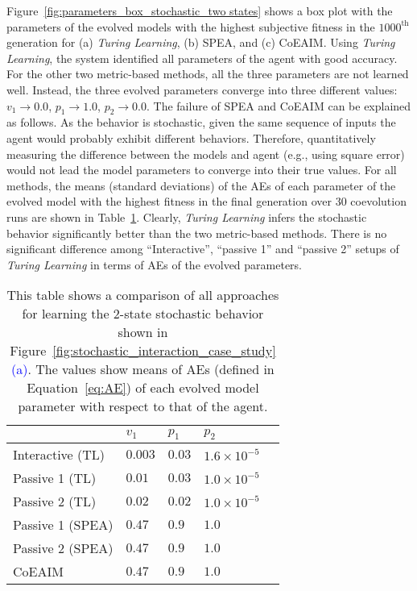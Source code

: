 Figure~\ref{fig:parameters_box_stochastic_two states} shows a box plot with the parameters of the evolved models with the highest subjective fitness in the $1000^\mathrm{th}$ generation for (a) \textit{Turing Learning}, (b) SPEA, and (c) CoEAIM. Using \textit{Turing Learning}, the system identified all parameters of the agent with good accuracy. For the other two metric-based methods, all the three parameters are not learned well. Instead, the three evolved parameters converge into three different values: $v_1 \rightarrow 0.0$, $p_1 \rightarrow 1.0$, $p_2 \rightarrow 0.0$. The failure of SPEA and CoEAIM can be explained as follows. As the behavior is stochastic, given the same sequence of inputs the agent would probably exhibit different behaviors. Therefore, quantitatively measuring the difference between the models and agent (e.g., using square error) would not lead the model parameters to converge into their true values. For all methods, the means (standard deviations) of the AEs of each parameter of the evolved model with the highest fitness in the final generation over $30$ coevolution runs are shown in Table~\ref{table:relative_accuracy_stochastic_2states}. Clearly, \textit{Turing Learning} infers the stochastic behavior significantly better than the two metric-based methods. There is no significant difference among ``Interactive'', ``passive 1'' and ``passive 2'' setups of \textit{Turing Learning} in terms of AEs of the evolved parameters. 

\begin{table}[!t] 
\caption{This table shows a comparison of all approaches for learning the 2-state stochastic behavior shown in Figure~\ref{fig:stochastic_interaction_case_study}\textcolor{blue}{(a)}. The values show means of AEs (defined in Equation~\ref{eq:AE}) of each evolved model parameter with respect to that of the agent.} 
\renewcommand{\arraystretch}{1.1}
\centering %
\begin{tabular}{l l l l l} %
\hline\hline  %
 & $v_1$ & $p_1$ & $p_2$ &  \\  
\hline   %
Interactive (TL) & $0.003$ & $0.03$ & $1.6\times10^{-5}$ \\ %
Passive 1 (TL) & $0.01$ & $0.03$ & $1.0\times10^{-5}$ \\ 
Passive 2 (TL) & $0.02$ & $0.02$ & $1.0\times10^{-5}$ \\ 
Passive 1 (SPEA) & $0.47$ & $0.9$ & $1.0$ \\ 
Passive 2 (SPEA) & $0.47$ & $0.9$ & $1.0$ \\ 
CoEAIM & $0.47$ & $0.9$ & $1.0$ \\
\hline %
\end{tabular} 
\label{table:relative_accuracy_stochastic_2states} 
\end{table} 

